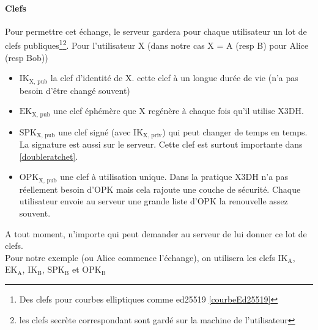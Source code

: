 \documentclass[a4paper, 12pt]{article}
\begin{document}
\paragraph{Clefs}
Pour permettre cet échange, le serveur gardera pour chaque utilisateur un lot de clefs publiques\footnote{Des clefs pour courbes elliptiques comme ed25519 \ref{courbeEd25519}}\footnote{les clefs secrète correspondant sont gardé sur la machine de l'utilisateur}. 
Pour l'utilisateur X (dans notre cas X = A (resp B) pour Alice (resp Bob))
\begin{itemize}
	\item $\text{IK}_{\text{X, pub}}$ la clef d'identité de X. cette clef à un longue durée de vie (n'a pas besoin d'être changé souvent)
	\item $\text{EK}_{\text{X, pub}}$ une clef éphémère que X regénère à chaque fois qu'il utilise X3DH.
	\item $\text{SPK}_{\text{X, pub}}$ une clef signé (avec $\text{IK}_{\text{X, priv}}$) qui peut changer de temps en temps. La signature est aussi sur le serveur. Cette clef est surtout importante dans \ref{doubleratchet}. 
	\item $\text{OPK}_{\text{X, pub}}$ une clef à utilisation unique. Dans la pratique X3DH n'a pas réellement besoin d'OPK mais cela rajoute une couche de sécurité. Chaque utilisateur envoie au serveur une grande liste d'OPK la renouvelle assez souvent.
\end{itemize}
A tout moment, n'importe qui peut demander au serveur de lui donner ce lot de clefs.\\

Pour notre exemple (ou Alice commence l'échange), on utilisera les clefs $\text{IK}_{\text{A}}$, $\text{EK}_{\text{A}}$, $\text{IK}_{\text{B}}$, $\text{SPK}_{\text{B}}$ et $\text{OPK}_{\text{B}}$
\end{document}
